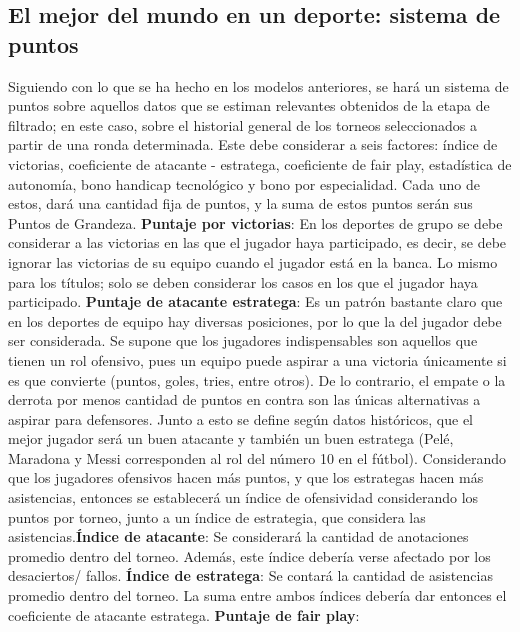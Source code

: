 \documentclass[a4paper]{article}
\begin{document}
\subsection{El mejor del mundo en un deporte: sistema de puntos}
Siguiendo con lo que se ha hecho en los modelos anteriores, se hará un sistema de puntos sobre aquellos datos que se estiman relevantes obtenidos de la etapa de filtrado; en este caso, sobre el historial general de los torneos seleccionados a partir de una ronda determinada. Este debe considerar a seis factores: índice de victorias, coeficiente de atacante - estratega, coeficiente de fair play, estadística de autonomía, bono handicap tecnológico y bono por especialidad. Cada uno de estos, dará una cantidad fija de puntos, y la suma de estos puntos serán sus Puntos de Grandeza.  \newline\newline \textbf{Puntaje por victorias}: En los deportes de grupo se debe considerar a las victorias en las que el jugador haya participado, es decir, se debe ignorar las victorias de su equipo cuando el jugador está en la banca. Lo mismo para los títulos; solo se deben considerar los casos en los que el jugador haya participado. \newline\newline \textbf{Puntaje de atacante estratega}: Es un patrón bastante claro que en los deportes de equipo hay diversas posiciones, por lo que la del jugador debe ser considerada. Se supone que los jugadores indispensables son aquellos que tienen un rol ofensivo, pues un equipo puede aspirar a una victoria únicamente si es que convierte (puntos, goles, tries, entre otros). De lo contrario,  el empate o la derrota por menos cantidad de puntos en contra son las únicas alternativas a aspirar para defensores. \newline\newline Junto a esto se define según datos históricos, que el mejor jugador será un buen atacante y también un buen estratega (Pelé, Maradona y Messi corresponden al rol del número 10 en el fútbol). Considerando que los jugadores ofensivos hacen más puntos, y que los estrategas hacen más asistencias, entonces se establecerá un índice de ofensividad considerando los puntos por torneo, junto a un índice de estrategia, que considera las asistencias.\newline\newline \textbf{Índice de atacante}: Se considerará la cantidad de anotaciones promedio dentro del torneo. Además, este índice debería verse afectado por los desaciertos/ fallos. \newline\newline \textbf{Índice de estratega}: Se contará la cantidad de asistencias promedio dentro del torneo. \newline\newline La suma entre ambos índices debería dar entonces el coeficiente de atacante estratega. \newline\newline \textbf{Puntaje de fair play}: 
\end{document}
